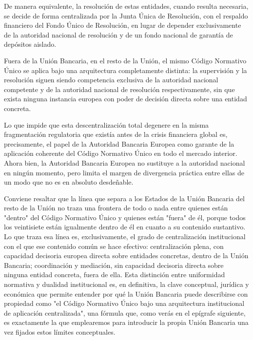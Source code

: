 \documentclass[10pt,a4paper]{article}
\begin{document}
{De manera equivalente, la resolución de estas entidades, cuando resulta necesaria, se decide de forma centralizada por la Junta Única de Resolución, con el respaldo financiero del Fondo Único de Resolución, en lugar de depender exclusivamente de la autoridad nacional de resolución y de un fondo nacional de garantía de depósitos aislado.

Fuera de la Unión Bancaria, en el resto de la Unión, el mismo Código Normativo Único se aplica bajo una arquitectura completamente distinta: la supervisión y la resolución siguen siendo competencia exclusiva de la autoridad nacional competente y de la autoridad nacional de resolución respectivamente, sin que exista ninguna instancia europea con poder de decisión directa sobre una entidad concreta. 

Lo que impide que esta descentralización total degenere en la misma fragmentación regulatoria que existía antes de la crisis financiera global es, precisamente, el papel de la Autoridad Bancaria Europea como garante de la aplicación coherente del Código Normativo Único en todo el mercado interior. Ahora bien, la Autoridad Bancaria Europea no sustituye a la autoridad nacional en ningún momento, pero limita el margen de divergencia práctica entre ellas de un modo que no es en absoluto desdeñable.


Conviene resaltar que la línea que separa a los Estados de la Unión Bancaria del resto de la Unión no traza una frontera de todo o nada entre quienes están "dentro" del Código Normativo Único y quienes están "fuera" de él, porque todos los veintisiete están igualmente dentro de él en cuanto a su contenido sustantivo. Lo que traza esa línea es, exclusivamente, el grado de centralización institucional con el que ese contenido común se hace efectivo: centralización plena, con capacidad decisoria europea directa sobre entidades concretas, dentro de la Unión Bancaria; coordinación y mediación, sin capacidad decisoria directa sobre ninguna entidad concreta, fuera de ella. Esta distinción entre uniformidad normativa y dualidad institucional es, en definitiva, la clave conceptual, jurídica y económica que permite entender por qué la Unión Bancaria puede describirse con propiedad como "el Código Normativo Único bajo una arquitectura institucional de aplicación centralizada", una fórmula que, como verás en el epígrafe siguiente, es exactamente la que emplearemos para introducir la propia Unión Bancaria una vez fijados estos límites conceptuales.




































}
\end{document}
